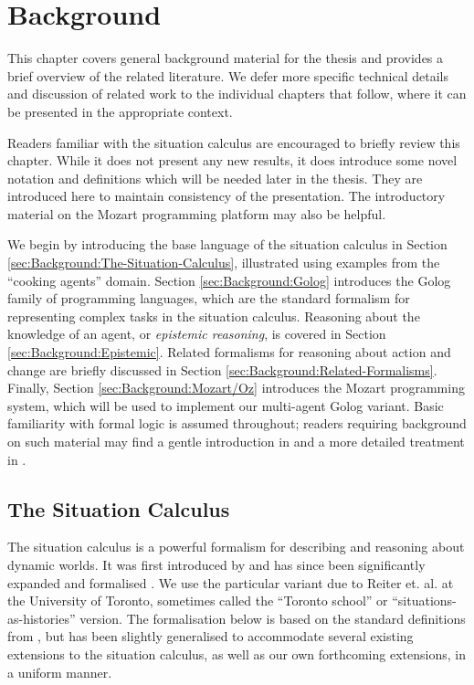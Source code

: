 

\chapter{Background}

\label{ch:background}

This chapter covers general background material for the thesis and
provides a brief overview of the related literature. We defer more
specific technical details and discussion of related work to the individual
chapters that follow, where it can be presented in the appropriate
context.

Readers familiar with the situation calculus are encouraged to briefly
review this chapter. While it does not present any new results, it
does introduce some novel notation and definitions which will be needed
later in the thesis. They are introduced here to maintain consistency
of the presentation. The introductory material on the Mozart programming
platform may also be helpful.

We begin by introducing the base language of the situation calculus
in Section \ref{sec:Background:The-Situation-Calculus}, illustrated
using examples from the {}``cooking agents'' domain. Section \ref{sec:Background:Golog}
introduces the Golog family of programming languages, which are the
standard formalism for representing complex tasks in the situation
calculus. Reasoning about the knowledge of an agent, or \emph{epistemic
reasoning}, is covered in Section \ref{sec:Background:Epistemic}.
Related formalisms for reasoning about action and change are briefly
discussed in Section \ref{sec:Background:Related-Formalisms}. Finally,
Section \ref{sec:Background:Mozart/Oz} introduces the Mozart programming
system, which will be used to implement our multi-agent Golog variant.
Basic familiarity with formal logic is assumed throughout; readers
requiring background on such material may find a gentle introduction
in \citep{kelly96logic} and a more detailed treatment in \citep{fitting96fol_book}.


\section{The Situation Calculus\label{sec:Background:The-Situation-Calculus}}

The situation calculus is a powerful formalism for describing and
reasoning about dynamic worlds. It was first introduced by \citet{McCHay69sitcalc}
and has since been significantly expanded and formalised \citep{reiter91frameprob,pirri99contributions_sitcalc}.
We use the particular variant due to Reiter et. al. at the University
of Toronto, sometimes called the {}``Toronto school'' or {}``situations-as-histories''
version. The formalisation below is based on the standard definitions
from \citep{levesque98sc_foundations,pirri99contributions_sitcalc,reiter01kia},
but has been slightly generalised to accommodate several existing
extensions to the situation calculus, as well as our own forthcoming
extensions, in a uniform manner.

